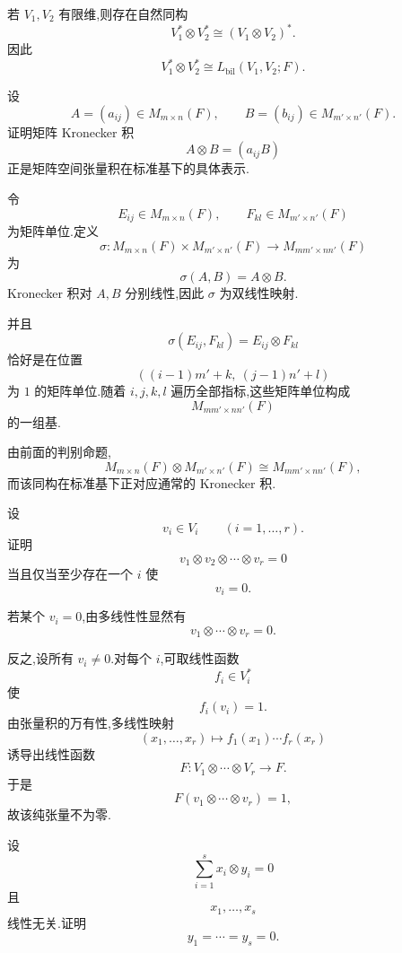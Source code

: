 \begin{theorem}[\markstar]
若 $V_1,V_2$ 有限维,则存在自然同构
\[
V_1^*\otimes V_2^*
\cong
(V_1\otimes V_2)^*.
\]
因此
\[
V_1^*\otimes V_2^*
\cong
L_{\mathrm{bil}}(V_1,V_2;F).
\]
\end{theorem}


\begin{example}[\markstar]
设
\[
A=(a_{ij})\in M_{m\times n}(F),
\qquad
B=(b_{ij})\in M_{m'\times n'}(F).
\]
证明矩阵 Kronecker 积
\[
A\otimes B
=
(a_{ij}B)
\]
正是矩阵空间张量积在标准基下的具体表示.
\end{example}
\exampleblank

\begin{solution}
令
\[
E_{ij}\in M_{m\times n}(F),
\qquad
F_{kl}\in M_{m'\times n'}(F)
\]
为矩阵单位.定义
\[
\sigma:
M_{m\times n}(F)\times M_{m'\times n'}(F)
\longrightarrow
M_{mm'\times nn'}(F)
\]
为
\[
\sigma(A,B)=A\otimes B.
\]
Kronecker 积对 $A,B$ 分别线性,因此 $\sigma$ 为双线性映射.

并且
\[
\sigma(E_{ij},F_{kl})
=
E_{ij}\otimes F_{kl}
\]
恰好是在位置
\[
((i-1)m'+k,\ (j-1)n'+l)
\]
为 $1$ 的矩阵单位.随着 $i,j,k,l$ 遍历全部指标,这些矩阵单位构成
\[
M_{mm'\times nn'}(F)
\]
的一组基.

由前面的判别命题,
\[
\boxed{
M_{m\times n}(F)\otimes M_{m'\times n'}(F)
\cong
M_{mm'\times nn'}(F),
}
\]
而该同构在标准基下正对应通常的 Kronecker 积.
\end{solution}


\begin{example}[\markstar]
设
\[
v_i\in V_i
\qquad
(i=1,\ldots,r).
\]
证明
\[
v_1\otimes v_2\otimes\cdots\otimes v_r=0
\]
当且仅当至少存在一个 $i$ 使
\[
v_i=0.
\]
\end{example}
\exampleblank

\begin{solution}
若某个 $v_i=0$,由多线性性显然有
\[
v_1\otimes\cdots\otimes v_r=0.
\]

反之,设所有 $v_i\neq0$.对每个 $i$,可取线性函数
\[
f_i\in V_i^*
\]
使
\[
f_i(v_i)=1.
\]
由张量积的万有性,多线性映射
\[
(x_1,\ldots,x_r)
\longmapsto
f_1(x_1)\cdots f_r(x_r)
\]
诱导出线性函数
\[
F:
V_1\otimes\cdots\otimes V_r\to F.
\]
于是
\[
F(v_1\otimes\cdots\otimes v_r)=1,
\]
故该纯张量不为零.
\end{solution}


\begin{example}
设
\[
\displaystyle\sum\limits_{i=1}^{s}x_i\otimes y_i=0
\]
且
\[
x_1,\ldots,x_s
\]
线性无关.证明
\[
y_1=\cdots=y_s=0.
\]
\end{example}
\exampleblank

